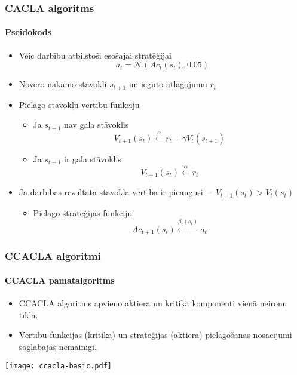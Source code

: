 \documentclass[xetex,mathserif]{beamer}
\begin{document}
  \begin{frame}
    \frametitle{CACLA algoritms}
    \framesubtitle{Pseidokods}
    \begin{itemize}
      \item Veic darbību atbilstoši esošajai stratēģijai
        \begin{equation*}
          a_t = \mathcal{N}\left(Ac_t(s_t), 0.05\right)
        \end{equation*}
      \item Novēro nākamo stāvokli $s_{t+1}$ un iegūto atlagojumu $r_{t}$
      \item Pielāgo stāvokļu vērtību funkciju
        \begin{itemize}
          \item Ja $s_{t+1}$ nav gala stāvoklis
            \begin{equation*}
              V_{t+1}(s_t) \xleftarrow{\alpha} r_t + \gamma V_t(s_{t + 1})
            \end{equation*}
          \item Ja $s_{t+1}$ ir gala stāvoklis
            \begin{equation*}
              V_{t+1}(s_t) \xleftarrow{\alpha} r_t
            \end{equation*}
        \end{itemize}
      \item Ja darbības rezultātā stāvokļa vērtība ir pieaugusi~--~$V_{t+1}(s_t)
        > V_t(s_t)$
        \begin{itemize}
          \item Pielāgo stratēģijas funkciju
            \begin{equation*}
              Ac_{t+1}(s_t) \xleftarrow{\beta_t(s_t)} a_t
            \end{equation*}
        \end{itemize}
    \end{itemize}
  \end{frame}

  \begin{frame}
    \frametitle{CCACLA algoritmi}
    \framesubtitle{CCACLA pamatalgoritms}
    \begin{itemize}
      \item CCACLA algoritms apvieno aktiera un kritiķa komponenti vienā neironu
        tīklā.
      \item Vērtību funkcijas (kritiķa) un stratēģijas (aktiera) pielāgošanas
        nosacījumi saglabājas nemainīgi.
    \end{itemize}
    \begin{center}
      \hspace{2cm} \texttt{[image: ccacla-basic.pdf]}
    \end{center}
  \end{frame}
\end{document}

